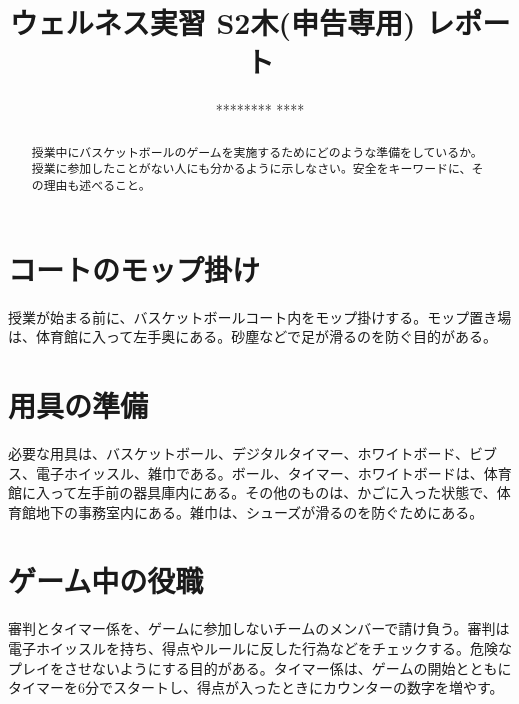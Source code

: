 \documentclass{jsarticle}
\title{ウェルネス実習 S2木(申告専用) レポート}
\author{******** ****}
\date{}
\begin{document}
\maketitle

\begin{abstract}
授業中にバスケットボールのゲームを実施するためにどのような準備をしているか。授業に参加したことがない人にも分かるように示しなさい。安全をキーワードに、その理由も述べること。
\end{abstract}

\section{コートのモップ掛け}

授業が始まる前に、バスケットボールコート内をモップ掛けする。モップ置き場は、体育館に入って左手奥にある。砂塵などで足が滑るのを防ぐ目的がある。

\section{用具の準備}

必要な用具は、バスケットボール、デジタルタイマー、ホワイトボード、ビブス、電子ホイッスル、雑巾である。ボール、タイマー、ホワイトボードは、体育館に入って左手前の器具庫内にある。その他のものは、かごに入った状態で、体育館地下の事務室内にある。雑巾は、シューズが滑るのを防ぐためにある。

\section{ゲーム中の役職}

審判とタイマー係を、ゲームに参加しないチームのメンバーで請け負う。審判は電子ホイッスルを持ち、得点やルールに反した行為などをチェックする。危険なプレイをさせないようにする目的がある。タイマー係は、ゲームの開始とともにタイマーを6分でスタートし、得点が入ったときにカウンターの数字を増やす。
\end{document}
